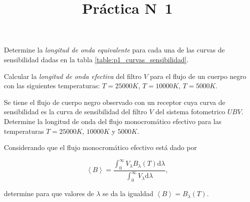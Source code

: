 \documentclass[12pt,a4paper]{practice}
\begin{document}
    \title{Práctica N\textdegree\ 1}
    \maketitle

    \begin{problem}\label{prob:1}
        Determine la \emph{longitud de onda equivalente} para cada una de las curvas de sensibilidad dadas en la tabla \ref{table:p1_curvas_sensibilidad}.
    \end{problem}

    \begin{problem}\label{prob:2}
        Calcular la \emph{longitud de onda efectiva} del filtro $V$ para el flujo de un cuerpo negro con las siguientes temperaturas: $T = 25000 K$, $T = 10000 K$, $T = 5000 K$.
    \end{problem}

    \begin{problem}\label{prob:3}
        Se tiene el flujo de cuerpo negro observado con un receptor cuya curva de sensibilidad es la curva de sensibilidad del filtro $V$ del sistema fotometrico $UBV$. Determine la longitud de onda del flujo monocromático efectivo para las temperaturas $T = 25000 K$, $10000 K$ y $5000 K$.

        \begin{recommendation}
            Considerando que el flujo monocromático efectivo está dado por

                $$\left\langle B\right\rangle = \frac{\displaystyle{\int_{0}^{\infty} V_{\lambda} B_{\lambda} \left(T\right) \mathrm{d}\lambda}}{\displaystyle{\int_{0}^{\infty} V_{\lambda} \mathrm{d}\lambda}},$$

            determine para que valores de $\lambda$ se da la igualdad $\left\langle B\right\rangle = B_{\lambda} \left(T\right)$.
        \end{recommendation}
    \end{problem}
\end{document}
